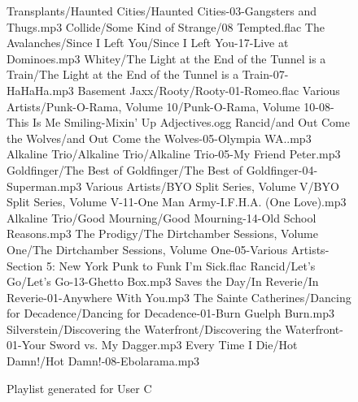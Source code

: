 \begin{figure}[!t]
	\caption{Playlist generated for User C}
	\label{fig:testing:user:playlist:c}
	\begin{listing}{1}
Transplants/Haunted Cities/Haunted Cities-03-Gangsters and Thugs.mp3
Collide/Some Kind of Strange/08 Tempted.flac
The Avalanches/Since I Left You/Since I Left You-17-Live at Dominoes.mp3
Whitey/The Light at the End of the Tunnel is a Train/The Light at the End of the Tunnel is a Train-07-HaHaHa.mp3
Basement Jaxx/Rooty/Rooty-01-Romeo.flac
Various Artists/Punk-O-Rama, Volume 10/Punk-O-Rama, Volume 10-08-This Is Me Smiling-Mixin' Up Adjectives.ogg
Rancid/and Out Come the Wolves/and Out Come the Wolves-05-Olympia WA..mp3
Alkaline Trio/Alkaline Trio/Alkaline Trio-05-My Friend Peter.mp3
Goldfinger/The Best of Goldfinger/The Best of Goldfinger-04-Superman.mp3
Various Artists/BYO Split Series, Volume V/BYO Split Series, Volume V-11-One Man Army-I.F.H.A. (One Love).mp3
Alkaline Trio/Good Mourning/Good Mourning-14-Old School Reasons.mp3
The Prodigy/The Dirtchamber Sessions, Volume One/The Dirtchamber Sessions, Volume One-05-Various Artists-Section 5: New York Punk to Funk I'm Sick.flac
Rancid/Let's Go/Let's Go-13-Ghetto Box.mp3
Saves the Day/In Reverie/In Reverie-01-Anywhere With You.mp3
The Sainte Catherines/Dancing for Decadence/Dancing for Decadence-01-Burn Guelph Burn.mp3
Silverstein/Discovering the Waterfront/Discovering the Waterfront-01-Your Sword vs. My Dagger.mp3
Every Time I Die/Hot Damn!/Hot Damn!-08-Ebolarama.mp3
\end{listing}
\end{figure}

